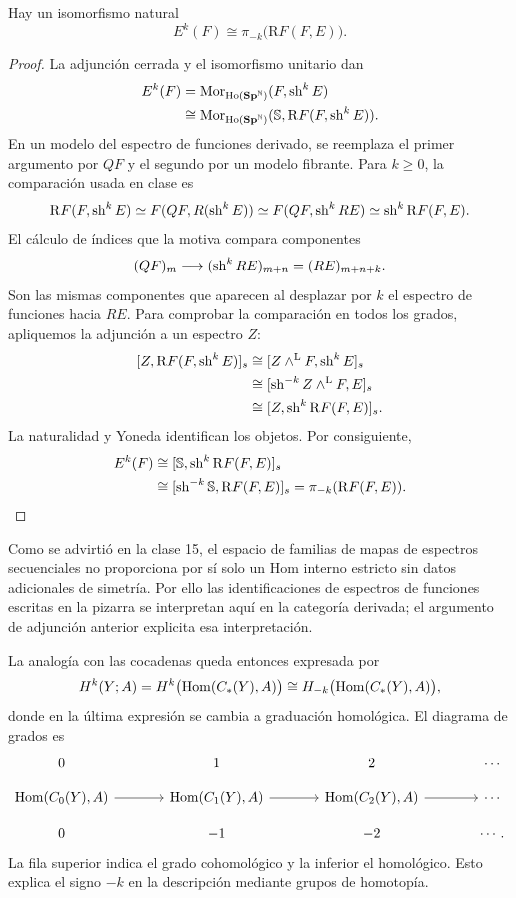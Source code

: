 \begin{prop}\label{prop:c19-cohomologia-funciones}
Hay un isomorfismo natural
\[
E^k(F)\cong\pi_{-k}\bigl(\mathrm RF(F,E)\bigr).
\]
\end{prop}
\begin{proof}
La adjunción cerrada y el isomorfismo unitario dan
\[
\begin{aligned}
E^k(F)&=\operatorname{Mor}_{\operatorname{Ho}(\mathbf{Sp}^{\mathbb N})}(F,\operatorname{sh}^kE)\\
&\cong\operatorname{Mor}_{\operatorname{Ho}(\mathbf{Sp}^{\mathbb N})}
(\mathbb S,\mathrm RF(F,\operatorname{sh}^kE)).
\end{aligned}
\]
En un modelo del espectro de funciones derivado, se reemplaza el primer argumento por $QF$ y el segundo por un modelo fibrante. Para $k\ge0$, la comparación usada en clase es
\[
\mathrm RF(F,\operatorname{sh}^kE)\simeq F(QF,R(\operatorname{sh}^kE))
\simeq F(QF,\operatorname{sh}^kRE)\simeq\operatorname{sh}^k\mathrm RF(F,E).
\]
El cálculo de índices que la motiva compara componentes
\[
(QF)_m\longrightarrow(\operatorname{sh}^kRE)_{m+n}=(RE)_{m+n+k}.
\]
Son las mismas componentes que aparecen al desplazar por $k$ el espectro de funciones hacia $RE$. Para comprobar la comparación en todos los grados, apliquemos la adjunción a un espectro $Z$:
\[
\begin{aligned}
[Z,\mathrm RF(F,\sh^kE)]_s
&\cong[Z\wedge^{\mathrm L}F,\sh^kE]_s\\
&\cong[\sh^{-k}Z\wedge^{\mathrm L}F,E]_s\\
&\cong[Z,\sh^k\mathrm RF(F,E)]_s.
\end{aligned}
\]
La naturalidad y Yoneda identifican los objetos. Por consiguiente,
\[
\begin{aligned}
E^k(F)&\cong[\mathbb S,\operatorname{sh}^k\mathrm RF(F,E)]_s\\
&\cong[\operatorname{sh}^{-k}\mathbb S,\mathrm RF(F,E)]_s
=\pi_{-k}(\mathrm RF(F,E)).
\end{aligned}
\]
\end{proof}
\begin{nota}
Como se advirtió en la clase 15, el espacio de familias de mapas de espectros secuenciales no proporciona por sí solo un Hom interno estricto sin datos adicionales de simetría. Por ello las identificaciones de espectros de funciones escritas en la pizarra se interpretan aquí en la categoría derivada; el argumento de adjunción anterior explicita esa interpretación.
\end{nota}

La analogía con las cocadenas queda entonces expresada por
\[
H^k(Y;A)=H^k\bigl(\operatorname{Hom}(C_*(Y),A)\bigr)
\cong H_{-k}\bigl(\operatorname{Hom}(C_*(Y),A)\bigr),
\]
donde en la última expresión se cambia a graduación homológica. El diagrama de grados es
\[
\begin{tikzcd}[column sep=large,row sep=1em]
0&1&2&\cdots\\
\Hom(C_0(Y),A)\arrow[r]&\Hom(C_1(Y),A)\arrow[r]
&\Hom(C_2(Y),A)\arrow[r]&\cdots\\
0&-1&-2&\cdots .
\end{tikzcd}
\]
La fila superior indica el grado cohomológico y la inferior el homológico. Esto explica el signo $-k$ en la descripción mediante grupos de homotopía.

